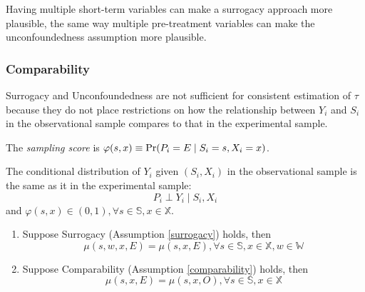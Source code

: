 \begin{note}
    Having multiple short-term variables can make a surrogacy approach more plausible, the same way multiple pre-treatment variables can make the unconfoundedness assumption more plausible.
\end{note}


\subsubsection*{Comparability}
Surrogacy and Unconfoundedness are not sufficient for consistent estimation of $\tau$ because they do not place restrictions on how the relationship between $Y_i$ and $S_i$ in the observational sample compares to that in the experimental sample.
\begin{definition}
    The \textit{sampling score} is $\varphi(s,x)\equiv \textnormal{Pr}(P_i=E\mid S_i=s,X_i=x)$.
\end{definition}

\begin{assumption}\label{comparability}
    The conditional distribution of $Y_i$ given $(S_i, X_i)$ in the observational sample is the same as it in the experimental sample:
    $$P_i\perp Y_i\mid S_i,X_i$$
    and $\varphi(s,x)\in (0,1),\forall s\in \mathbb{S},x\in \mathbb{X}$.
\end{assumption}


\begin{proposition}
    \begin{enumerate}
        \item Suppose Surrogacy (Assumption \ref{surrogacy}) holds, then $$\mu(s,w,x,E)=\mu(s,x,E),\forall s\in \mathbb{S},x\in \mathbb{X},w\in \mathbb{W}$$
        \item Suppose Comparability (Assumption \ref{comparability}) holds, then $$\mu(s,x,E)=\mu(s,x,O),\forall s\in \mathbb{S},x\in \mathbb{X}$$
    \end{enumerate}
\end{proposition}